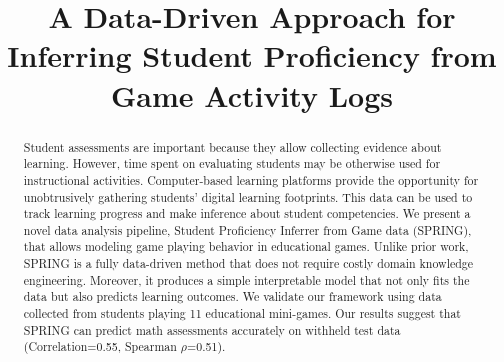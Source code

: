 \documentclass{sigchi}
\def\algname{SPRING\xspace}
\def\plaintitle{A Data-Driven Approach for Inferring Student Proficiency from Game Activity Logs  }
\begin{document}
	
	
	\title{\plaintitle}
	
	\author
	{%
	}
	
	
	\maketitle
	
	\begin{abstract}
		Student assessments are important because they allow collecting evidence about learning. 
		However, time spent on evaluating students may be otherwise used for instructional activities.
		Computer-based learning platforms provide the opportunity for unobtrusively gathering students' digital learning footprints.
		This data can be used to track learning progress and make inference about student competencies.
		We present a novel data analysis pipeline, {Student Proficiency Inferrer from Game data} (\algname), that allows modeling  game playing behavior in educational games.
		Unlike prior work, \algname is a fully data-driven method that does not require costly domain knowledge engineering.
		Moreover, it produces a simple interpretable model that not only fits the data but also predicts learning outcomes.
		We validate our framework using data collected from students playing 11 educational mini-games.
		Our results suggest that \algname can predict math assessments accurately on withheld test data (Correlation=0.55, Spearman $\rho$=0.51).
	\end{abstract}
	
\end{document}

